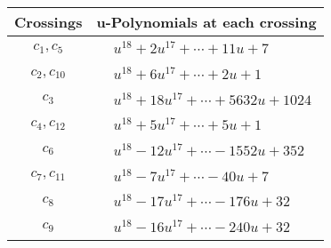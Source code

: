 \documentclass[1p]{elsarticle_modified}
\theoremstyle{definition}
\begin{document}
\begin{tabular}{m{50pt}|m{274pt}}
Crossings & \hspace{64pt}u-Polynomials at each crossing \\
\hline $$\begin{aligned}c_{1},c_{5}\end{aligned}$$&$\begin{aligned}
&u^{18}+2 u^{17}+\cdots+11 u+7
\end{aligned}$\\
\hline $$\begin{aligned}c_{2},c_{10}\end{aligned}$$&$\begin{aligned}
&u^{18}+6 u^{17}+\cdots+2 u+1
\end{aligned}$\\
\hline $$\begin{aligned}c_{3}\end{aligned}$$&$\begin{aligned}
&u^{18}+18 u^{17}+\cdots+5632 u+1024
\end{aligned}$\\
\hline $$\begin{aligned}c_{4},c_{12}\end{aligned}$$&$\begin{aligned}
&u^{18}+5 u^{17}+\cdots+5 u+1
\end{aligned}$\\
\hline $$\begin{aligned}c_{6}\end{aligned}$$&$\begin{aligned}
&u^{18}-12 u^{17}+\cdots-1552 u+352
\end{aligned}$\\
\hline $$\begin{aligned}c_{7},c_{11}\end{aligned}$$&$\begin{aligned}
&u^{18}-7 u^{17}+\cdots-40 u+7
\end{aligned}$\\
\hline $$\begin{aligned}c_{8}\end{aligned}$$&$\begin{aligned}
&u^{18}-17 u^{17}+\cdots-176 u+32
\end{aligned}$\\
\hline $$\begin{aligned}c_{9}\end{aligned}$$&$\begin{aligned}
&u^{18}-16 u^{17}+\cdots-240 u+32
\end{aligned}$\\
\hline
\end{tabular}\\~\\
\end{document}
